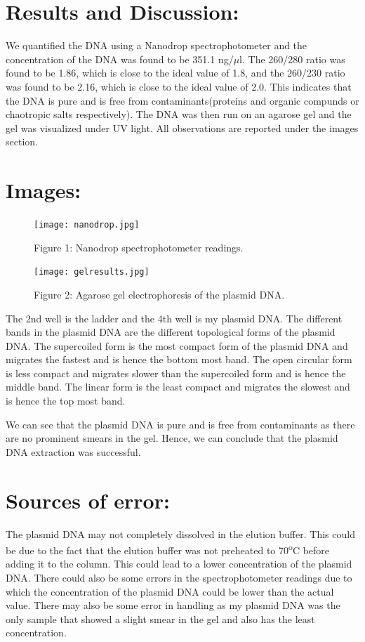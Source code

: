 \documentclass{report}
\begin{document}
\section*{Results and Discussion:}
We quantified the DNA using a Nanodrop spectrophotometer and the concentration of the DNA was found to be 351.1 ng/$\mu$l.
The 260/280 ratio was found to be 1.86, which is close to the ideal value of 1.8, and the 260/230 ratio was found to be 2.16, 
which is close to the ideal value of 2.0. This indicates that the DNA is pure and is free from contaminants(proteins and organic compunds or chaotropic salts respectively).
The DNA was then run on an agarose gel and the gel was visualized under UV light.
All observations are reported under the images section.

\section*{Images:}
\begin{figure}[!ht]
    \centering
    \texttt{[image: nanodrop.jpg]}
    \caption*{Figure 1: Nanodrop spectrophotometer readings.} 
\end{figure}

\begin{figure}[!ht]
    \centering
    \texttt{[image: gelresults.jpg]}
    \caption*{Figure 2: Agarose gel electrophoresis of the plasmid DNA.}
\end{figure}
The 2nd well is the ladder and the 4th well is my plasmid DNA.
The different bands in the plasmid DNA are the different topological forms of the plasmid DNA.
The supercoiled form is the most compact form of the plasmid DNA and migrates the fastest and is hence the bottom most band.
The open circular form is less compact and migrates slower than the supercoiled form and is hence the middle band.
The linear form is the least compact and migrates the slowest and is hence the top most band.

We can see that the plasmid DNA is pure and is free from contaminants as there are no prominent smears in the gel.
Hence, we can conclude that the plasmid DNA extraction was successful.

\section*{Sources of error:}
The plasmid DNA may not completely dissolved in the elution buffer. This could be due to the fact that the elution buffer was not preheated to 70\textsuperscript{o}C before adding it to the column.
This could lead to a lower concentration of the plasmid DNA.
There could also be some errors in the spectrophotometer readings due to which the concentration of the plasmid DNA could be lower than the actual value.
There may also be some error in handling as my plasmid DNA was the only sample that showed a slight smear in the gel and also has the least concentration.
\end{document}
